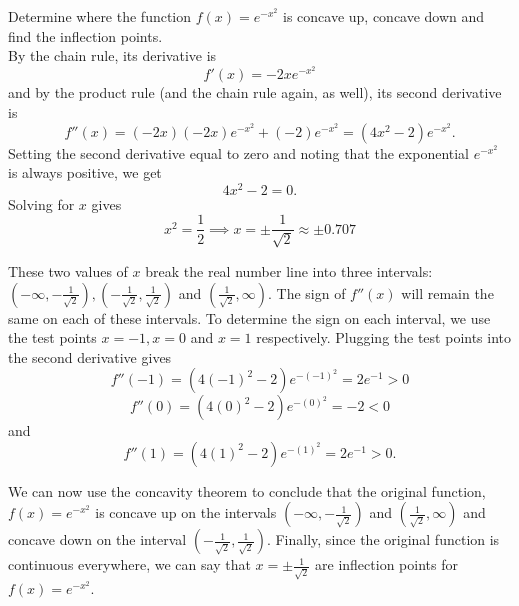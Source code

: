 \documentclass[handout]{ximera}
\begin{document}
\begin{example}[example 7]
Determine where the function $f(x) = e^{-x^2}$ is concave up, concave down and find the 
inflection points.\\
By the chain rule, its derivative is 
\[
f'(x) = -2xe^{-x^2}
\]
and by the product rule (and the chain rule again, as well), its second derivative is
\[
f''(x) = (-2x)(-2x)e^{-x^2} + (-2)e^{-x^2} = (4x^2 - 2)e^{-x^2}.
\]
Setting the second derivative equal to zero and noting that the exponential $e^{-x^2}$ is
always positive, we get
\[
4x^2 - 2 = 0.
\]
Solving for $x$ gives
\[
x^2 = \frac 12 \implies  x = \pm \frac{1}{\sqrt{2}} \approx \pm 0.707
\]

These two values of $x$ break the real number line into three 
intervals: $(-\infty, -\tfrac{1}{\sqrt 2}),
(-\tfrac{1}{\sqrt 2}, \tfrac{1}{\sqrt 2})$ and $(\tfrac{1}{\sqrt 2}, \infty)$. 
The sign of $f''(x)$ will remain the same on each of these intervals. 
To determine the sign on each interval, we use the test points
$x = -1, x = 0$ and $x = 1$ respectively.
Plugging the test points into the second derivative gives
\[
f''(-1) = (4(-1)^2 - 2) e^{-(-1)^2} = 2e^{-1} > 0
\]
\[
f''(0) = (4(0)^2 - 2) e^{-(0)^2} = -2 < 0
\]
and
\[
f''(1) = (4(1)^2 - 2) e^{-(1)^2} = 2e^{-1} > 0.
\]





\begin{image}
\end{image}





We can now use the concavity theorem to conclude that
the original function, $f(x) = e^{-x^2}$
is concave up on the intervals $(-\infty, -\frac{1}{\sqrt 2})$ and $(\frac{1}{\sqrt 2}, \infty)$ and 
concave down on the interval $(-\frac{1}{\sqrt 2},\frac{1}{\sqrt 2})$. 
Finally, since the original function is continuous everywhere, we can
say that $x = \pm \frac{1}{\sqrt 2}$ are inflection points for $f(x) = e^{-x^2}$.


\end{example}
\end{document}
